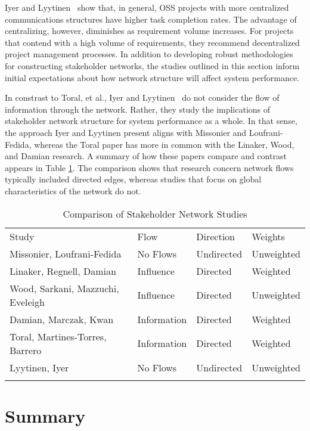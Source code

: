 Iyer and Lyytinen~\cite{iyer} show that, in general, OSS projects with more centralized communications structures have higher task completion rates. The advantage of centralizing, however, diminishes as requirement volume increases. For projects that contend with a high volume of requirements, they recommend decentralized project management processes. In addition to developing robust methodologies for constructing stakeholder networks, the studies outlined in this section inform initial expectations about how network structure will affect system performance.

In constrast to Toral, et al., Iyer and Lyytinen~\cite{iyer} do not consider the flow of information through the network. Rather, they  study the implications of stakeholder network structure for system performance as a whole. In that sense, the approach Iyer and Lyytinen present aligns with Missonier and Loufrani-Fedida, whereas the Toral paper has more in common with the Linaker, Wood, and Damian research. A summary of how these papers compare and contrast appears in Table \ref{network_study_comparison}. The comparison shows that research concern network flows typically included directed edges, whereas studies that focus on global characteristics of the network do not.

\begin{table}
\caption{Comparison of Stakeholder Network Studies}
\label{network_study_comparison}
\begin{tabular}{llll}
\hline\noalign{\smallskip}
Study & Flow  & Direction & Weights  \\
\noalign{\smallskip}\hline\noalign{\smallskip}
Missonier, Loufrani-Fedida  & No Flows & Undirected & Unweighted  \\
Linaker, Regnell, Damian & Influence & Directed & Weighted \\
Wood, Sarkani, Mazzuchi, Eveleigh & Influence & Directed & Unweighted \\
Damian, Marczak, Kwan  & Information & Directed & Weighted \\
Toral, Martines-Torres, Barrero & Information & Directed & Weighted \\
Lyytinen, Iyer  & No Flows  & Undirected & Unweighted \\ 
\noalign{\smallskip}\hline
\end{tabular}
\end{table}

\section{Summary}


